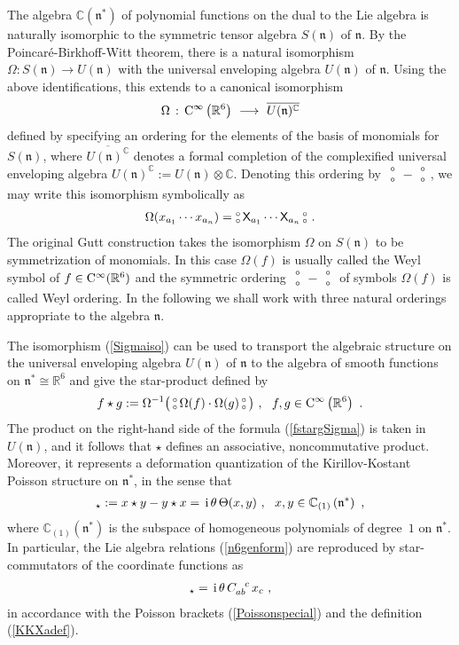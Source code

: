 \documentclass[11pt,a4paper]{article}
\newcommand{\NO}{\mbox{$\substack{\circ\\\circ}$}}      %
\def\ii{{\,{\rm i}\,}}
\def\CC{{\rm C}}
\def\X{{\sf X}}
\def\mfn{{\mathfrak n}}
\newcommand{\complex}{{\mathbb C}} %
\newcommand{\real}{{\mathbb R}} %
\newcommand{\beq}{\begin{eqnarray}}
\newcommand{\eeq}{\end{eqnarray}}
\begin{document}
The algebra $\complex(\mfn^*)$ of polynomial functions on the dual
to the Lie algebra is naturally isomorphic to the symmetric tensor algebra
$S(\mfn)$ of $\mfn$. By the Poincar\'e-Birkhoff-Witt theorem,
there is a natural isomorphism $\Omega:S(\mfn)\to
U(\mfn)$ with the universal enveloping algebra $U(\mfn)$ of
$\mfn$. Using the above identifications, this extends to a canonical
isomorphism
\beq
\Omega\,:\,\CC^\infty\left(\real^6\right)~\longrightarrow~\overline{
U(\mfn)^\complex}
\label{Sigmaiso}\eeq
defined by specifying an ordering for the elements of the
basis of monomials for $S(\mfn)$, where
$\overline{U(\mfn)^\complex}$ denotes a formal completion of the
complexified universal enveloping algebra
$U(\mathfrak{n})^\complex:=U(\mathfrak{n})\otimes\complex$.
Denoting this ordering by $\NO-\NO$, we may write this
isomorphism symbolically as
\beq
\Omega(x_{a_1}\cdots x_{a_n})=\NO\,\X_{a_1}\cdots\X_{a_n}\,\NO \ .
\label{Sigmasymbol}\eeq
The original Gutt construction takes the isomorphism
$\Omega$ on $S(\mfn)$ to be symmetrization of monomials. In this
case $\Omega(f)$ is usually called the Weyl symbol of
$f\in\CC^\infty(\real^6)$ and the symmetric ordering $\NO-\NO$
of symbols $\Omega(f)$ is called Weyl ordering. In the following we
shall work with three natural orderings appropriate to the
algebra $\mfn$.

The isomorphism (\ref{Sigmaiso}) can be used to transport the
algebraic structure on the universal enveloping algebra $U(\mfn)$ of
$\mfn$ to the algebra of smooth functions on $\mfn^*\cong\real^6$
and give the star-product defined by
\beq
f\star g:=\Omega^{-1}\bigl(\,\NO\,\Omega(f)\cdot\Omega(g)\,\NO
\,\bigr) \ , ~~ f,g\in\CC^\infty\left(\real^6\right) \ .
\label{fstargSigma}\eeq
The product on the right-hand side of the formula (\ref{fstargSigma})
is taken in $U(\mfn)$, and it follows that $\star$ defines an
associative, noncommutative product. Moreover, it represents a
deformation quantization of the Kirillov-Kostant Poisson structure on
$\mfn^*$, in the sense that
\beq
[x,y]_\star:=x\star y-y\star x=\ii
\theta\,\Theta(x,y) \ , ~~ x,y\in\complex_{(1)}\left(\mfn^*\right) \ ,
\label{xyPoisson}\eeq
where $\complex_{(1)}(\mfn^*)$ is the subspace of homogeneous
polynomials of degree~$1$ on $\mfn^*$. In particular, the Lie
algebra relations (\ref{n6genform}) are reproduced by star-commutators
of the coordinate functions as
\beq
[x_a,x_b]_\star=\ii\theta\,C_{ab}^{~~c}\,x_c \ ,
\label{xaxbstarcomm}\eeq
in accordance with the Poisson brackets (\ref{Poissonspecial}) and the
definition (\ref{KKXadef}).
\end{document}
